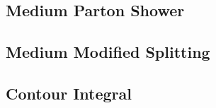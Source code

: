 \documentclass[12pt]{article}
\begin{document}
\newpage


\subsection{Medium Parton Shower}

\begin{center}
	


\end{center}



\subsection{Medium Modified Splitting}

\begin{center}
	

	
\end{center}





\subsection{Contour Integral}

\begin{center}



\end{center}
\end{document}
